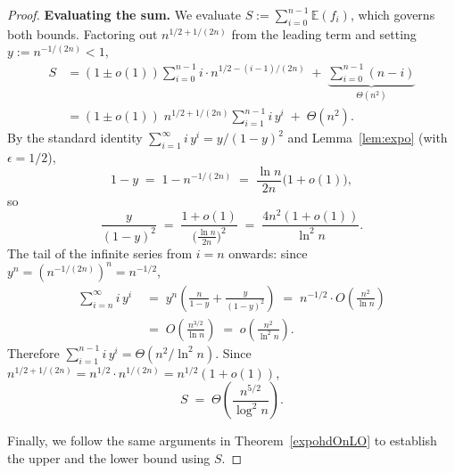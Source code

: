 \documentclass[lettersize,journal]{IEEEtran}
\newcommand{\EE}{\mathbb{E}}
\begin{document}
\begin{proof}
\medskip
\noindent\textbf{Evaluating the sum.}
We evaluate $S := \sum_{i=0}^{n-1} \EE(f_i)$, which governs both bounds.
Factoring out $n^{1/2+1/(2n)}$ from the leading term and setting
$y:=n^{-1/(2n)}<1$,
\begin{align*}
S
&= (1\pm o(1))\sum_{i=0}^{n-1} i\cdot n^{1/2-(i-1)/(2n)}
   \;+\;\underbrace{\sum_{i=0}^{n-1}(n-i)}_{\Theta(n^2)} \\
&= (1\pm o(1))\;n^{1/2+1/(2n)}\sum_{i=1}^{n-1} i\,y^{i}
   \;+\;\Theta(n^2).
\end{align*}
By the standard identity $\sum_{i=1}^{\infty} i\,y^i = y/(1-y)^2$
and Lemma~\ref{lem:expo} (with $\epsilon=1/2$),
\[
1-y \;=\; 1 - n^{-1/(2n)}
    \;=\; \frac{\ln n}{2n}\bigl(1+o(1)\bigr),
\]
so
\[
\frac{y}{(1-y)^2}
\;=\; \frac{1+o(1)}{\bigl(\frac{\ln n}{2n}\bigr)^2}
\;=\; \frac{4n^2(1+o(1))}{\ln^2 n}.
\]
The tail of the infinite series from $i=n$ onwards:
since $y^n = (n^{-1/(2n)})^n = n^{-1/2}$,
\begin{align*}
\sum_{i=n}^{\infty} i\,y^i
\;&=\; y^n\!\left(\frac{n}{1-y}+\frac{y}{(1-y)^2}\right)
\;=\; n^{-1/2}\cdot O\!\left(\frac{n^2}{\ln n}\right)
\\\;&=\; O\!\left(\frac{n^{3/2}}{\ln n}\right)
\;=\; o\!\left(\frac{n^2}{\ln^2 n}\right).
\end{align*}
Therefore $\sum_{i=1}^{n-1} i\,y^{i} = \Theta(n^2/\ln^2 n)$.
Since $n^{1/2+1/(2n)} = n^{1/2}\cdot n^{1/(2n)} = n^{1/2}(1+o(1))$,
\begin{equation}\label{eq:S-expoHD}
S \;=\; \Theta\!\left(\frac{n^{5/2}}{\log^2 n}\right).
\end{equation}

Finally, we follow the same arguments in Theorem~\ref{expohdOnLO} to establish the upper and the lower bound using $S$.
\end{proof}
\end{document}
